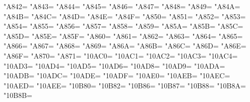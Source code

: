 \XeTeXcharclass"A842=\KclassArabD
\XeTeXcharclass"A843=\KclassArabD
\XeTeXcharclass"A844=\KclassArabD
\XeTeXcharclass"A845=\KclassArabD
\XeTeXcharclass"A846=\KclassArabD
\XeTeXcharclass"A847=\KclassArabD
\XeTeXcharclass"A848=\KclassArabD
\XeTeXcharclass"A849=\KclassArabD
\XeTeXcharclass"A84A=\KclassArabD
\XeTeXcharclass"A84B=\KclassArabD
\XeTeXcharclass"A84C=\KclassArabD
\XeTeXcharclass"A84D=\KclassArabD
\XeTeXcharclass"A84E=\KclassArabD
\XeTeXcharclass"A84F=\KclassArabD
\XeTeXcharclass"A850=\KclassArabD
\XeTeXcharclass"A851=\KclassArabD
\XeTeXcharclass"A852=\KclassArabD
\XeTeXcharclass"A853=\KclassArabD
\XeTeXcharclass"A854=\KclassArabD
\XeTeXcharclass"A855=\KclassArabD
\XeTeXcharclass"A856=\KclassArabD
\XeTeXcharclass"A857=\KclassArabD
\XeTeXcharclass"A858=\KclassArabD
\XeTeXcharclass"A859=\KclassArabD
\XeTeXcharclass"A85A=\KclassArabD
\XeTeXcharclass"A85B=\KclassArabD
\XeTeXcharclass"A85C=\KclassArabD
\XeTeXcharclass"A85D=\KclassArabD
\XeTeXcharclass"A85E=\KclassArabD
\XeTeXcharclass"A85F=\KclassArabD
\XeTeXcharclass"A860=\KclassArabD
\XeTeXcharclass"A861=\KclassArabD
\XeTeXcharclass"A862=\KclassArabD
\XeTeXcharclass"A863=\KclassArabD
\XeTeXcharclass"A864=\KclassArabD
\XeTeXcharclass"A865=\KclassArabD
\XeTeXcharclass"A866=\KclassArabD
\XeTeXcharclass"A867=\KclassArabD
\XeTeXcharclass"A868=\KclassArabD
\XeTeXcharclass"A869=\KclassArabD
\XeTeXcharclass"A86A=\KclassArabD
\XeTeXcharclass"A86B=\KclassArabD
\XeTeXcharclass"A86C=\KclassArabD
\XeTeXcharclass"A86D=\KclassArabD
\XeTeXcharclass"A86E=\KclassArabD
\XeTeXcharclass"A86F=\KclassArabD
\XeTeXcharclass"A870=\KclassArabD
\XeTeXcharclass"A871=\KclassArabD
\XeTeXcharclass"10AC0=\KclassArabD
\XeTeXcharclass"10AC1=\KclassArabD
\XeTeXcharclass"10AC2=\KclassArabD
\XeTeXcharclass"10AC3=\KclassArabD
\XeTeXcharclass"10AC4=\KclassArabD
\XeTeXcharclass"10AD3=\KclassArabD
\XeTeXcharclass"10AD4=\KclassArabD
\XeTeXcharclass"10AD5=\KclassArabD
\XeTeXcharclass"10AD6=\KclassArabD
\XeTeXcharclass"10AD8=\KclassArabD
\XeTeXcharclass"10AD9=\KclassArabD
\XeTeXcharclass"10ADA=\KclassArabD
\XeTeXcharclass"10ADB=\KclassArabD
\XeTeXcharclass"10ADC=\KclassArabD
\XeTeXcharclass"10ADE=\KclassArabD
\XeTeXcharclass"10ADF=\KclassArabD
\XeTeXcharclass"10AE0=\KclassArabD
\XeTeXcharclass"10AEB=\KclassArabD
\XeTeXcharclass"10AEC=\KclassArabD
\XeTeXcharclass"10AED=\KclassArabD
\XeTeXcharclass"10AEE=\KclassArabD
\XeTeXcharclass"10B80=\KclassArabD
\XeTeXcharclass"10B82=\KclassArabD
\XeTeXcharclass"10B86=\KclassArabD
\XeTeXcharclass"10B87=\KclassArabD
\XeTeXcharclass"10B88=\KclassArabD
\XeTeXcharclass"10B8A=\KclassArabD
\XeTeXcharclass"10B8B=\KclassArabD
